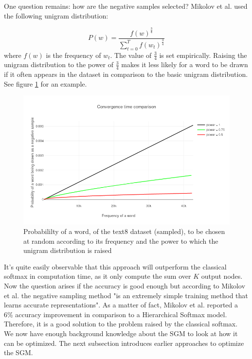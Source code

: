 One question remains: how are the negative samples selected? Mikolov et al. \cite{mikolov2} used the following unigram distribution:

\begin{equation} \label{eq:unigram}
P(w)=\frac{f(w)^{\frac{3}{4}}}{\sum_{t=0}^{T} f(w_t)^{\frac{3}{4}}}
\end{equation}
where $f(w)$ is the frequency of $w_t$. The value of $\frac{3}{4}$ is set empirically. Raising the unigram distribution to the power of $\frac{3}{4}$ makes it less likely for a word to be drawn if it often appears in the dataset in comparison to the basic unigram distribution. See figure \ref{fig:frequency_ex} for an example.
\begin{figure}[ht]
\centering
\includegraphics[scale=0.30]{images/frequency_ex}
\caption{Probabililty of a word, of the text8 dataset (sampled), to be chosen at random according to its frequency and the power to which the unigram distribution is raised}
\label{fig:frequency_ex}
\end{figure}
It's quite easily observable that this approach will outperform the classical softmax in computation time, as it only compute the sum over $K$ output nodes. Now the question arises if the accuracy is good enough but according to Mikolov et al. \cite{mikolov2} the negative sampling method "is an extremely simple training method that learns accurate representations". As a matter of fact, Mikolov et al. \cite{mikolov2} reported a 6\% accuracy improvement in comparison to a Hierarchical Softmax model. Therefore, it is a good solution to the problem raised by the classical softmax.
We now have enough background knowledge about the SGM to look at how it can be optimized. The next subsection introduces earlier approaches to optimize the SGM.